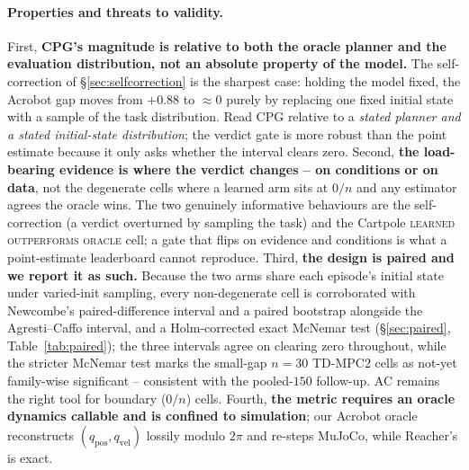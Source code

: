 \documentclass[10pt,letterpaper]{article}
\begin{document}
\paragraph{Properties and threats to validity.} First, \textbf{CPG's magnitude is relative to both the oracle planner and the evaluation distribution, not an absolute property of the model.} The self-correction of \S\ref{sec:selfcorrection} is the sharpest case: holding the model fixed, the Acrobot gap moves from $+0.88$ to $\approx 0$ purely by replacing one fixed initial state with a sample of the task distribution. Read CPG relative to a \emph{stated planner and a stated initial-state distribution}; the verdict gate is more robust than the point estimate because it only asks whether the interval clears zero. Second, \textbf{the load-bearing evidence is where the verdict changes -- on conditions or on data}, not the degenerate cells where a learned arm sits at $0/n$ and any estimator agrees the oracle wins. The two genuinely informative behaviours are the self-correction (a verdict overturned by sampling the task) and the Cartpole \textsc{learned outperforms oracle} cell; a gate that flips on evidence and conditions is what a point-estimate leaderboard cannot reproduce. Third, \textbf{the design is paired and we report it as such.} Because the two arms share each episode's initial state under varied-init sampling, every non-degenerate cell is corroborated with Newcombe's paired-difference interval and a paired bootstrap alongside the Agresti--Caffo interval, and a Holm-corrected exact McNemar test (\S\ref{sec:paired}, Table~\ref{tab:paired}); the three intervals agree on clearing zero throughout, while the stricter McNemar test marks the small-gap $n=30$ TD-MPC2 cells as not-yet family-wise significant -- consistent with the pooled-$150$ follow-up. AC remains the right tool for boundary ($0/n$) cells. Fourth, \textbf{the metric requires an oracle dynamics callable and is confined to simulation}; our Acrobot oracle reconstructs $(q_{\mathrm{pos}}, q_{\mathrm{vel}})$ lossily modulo $2\pi$ and re-steps MuJoCo, while Reacher's is exact.
\end{document}
